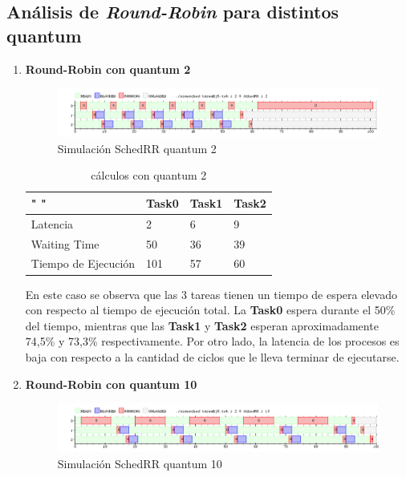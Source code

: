 \documentclass[11pt]{article}
\begin{document}
\subsection{Análisis de \textit{Round-Robin} para distintos quantum}
\begin{enumerate}
\item \textbf{Round-Robin con quantum 2}

      \begin{figure}[H]
        \includegraphics[scale=0.5]{Ej5q2}
        \caption{Simulación SchedRR quantum 2}
      \end{figure}

\begin{table}[htb]
\centering
\begin{tabular}{| l | l | l | l |}
\hline
" " & Task0 & Task1 & Task2 \\
\hline \hline
Latencia & 2 & 6 & 9 \\ \hline
Waiting Time & 50 & 36 & 39 \\ \hline
Tiempo de Ejecución & 101 & 57 & 60 \\ \hline
\end{tabular}
\caption{cálculos con quantum 2}
\end{table}

En este caso se observa que las 3 tareas tienen un tiempo de espera elevado con respecto al tiempo de ejecución total. La \textbf{Task0} espera durante el 50\% del tiempo, mientras que las \textbf{Task1} y \textbf{Task2} esperan aproximadamente 74,5\% y 73,3\% respectivamente. Por otro lado, la latencia de los procesos es baja con respecto a la cantidad de ciclos que le lleva terminar de ejecutarse. 

\item \textbf{Round-Robin con quantum 10}

      \begin{figure}[H]
        \includegraphics[scale=0.5]{Ej5q10}
        \caption{Simulación SchedRR quantum 10}
      \end{figure}


\end{enumerate}
\end{document}
